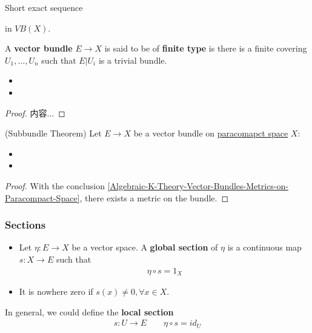 \documentclass[Total.tex]{subfiles}
\begin{document}
	Short exact sequence
	\begin{center}
	\end{center}
	
	in $VB(X)$.
	
	\begin{Def}
		A \textbf{vector bundle} $E\rightarrow X$ is said to be of \textbf{finite type} is there is a finite covering $U_1,\dots,U_n$ such that $E|U_i$ is a trivial bundle.
	\end{Def}
	
	\begin{proposition}
		\begin{itemize}
			\item 
			\item 
		\end{itemize}
	\end{proposition}
	
	\begin{proof}
		内容...
	\end{proof}
	
	\begin{theorem}
		(Subbundle Theorem) Let $E\rightarrow X$ be a vector bundle on \underline{paracomapct space} $X$:
		
		\begin{itemize}
			\item 
			\item 
		\end{itemize}
	\end{theorem}
	
	\begin{proof}
		With the conclusion \ref{Algebraic-K-Theory-Vector-Bundles-Metrics-on-Paracompact-Space}, there exists a metric on the bundle. 
	\end{proof}
	\subsubsection{Sections}
	
	\begin{Def}
		\begin{itemize}
			\item Let $\eta:E\rightarrow X$ be a vector space. A \textbf{global section} of $\eta$ is a continuous map $s:X\rightarrow E$ such that
			\begin{gather*}
				\eta\circ s=1_X
			\end{gather*}
			
			\item It is nowhere zero if $s(x)\not=0,\forall x\in X$.
		\end{itemize}
	\end{Def}
	In general, we could define the \textbf{local section} 
	\begin{gather*}
		s:U\rightarrow E\qquad\eta\circ s=id_U
	\end{gather*}
	
\end{document}
